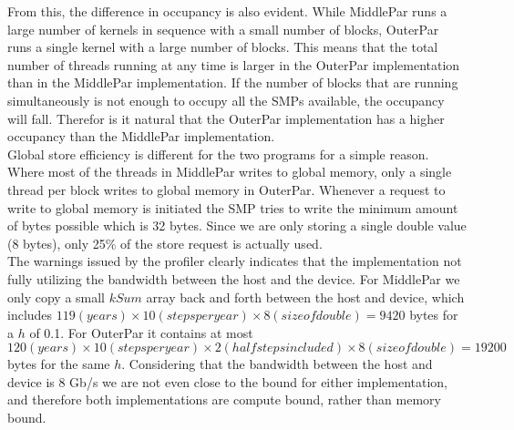 From this, the difference in occupancy is also evident. While MiddlePar runs a large number of kernels in sequence with a small number of blocks, OuterPar runs a single kernel with a large number of blocks. This means that the total number of threads running at any time is larger in the OuterPar implementation than in the MiddlePar implementation. If the number of blocks that are running simultaneously is not enough to occupy all the SMPs available, the occupancy will fall. Therefor is it natural that the OuterPar implementation has a higher occupancy than the MiddlePar implementation. \\


Global store efficiency is different for the two programs for a simple reason. Where most of the threads in MiddlePar writes to global memory, only a single thread per block writes to global memory in OuterPar. Whenever a request to write to global memory is initiated the SMP tries to write the minimum amount of bytes possible which is 32 bytes. Since we are only storing a single double value (8 bytes), only 25\% of the store request is actually used. \\

The warnings issued by the profiler clearly indicates that the implementation not fully utilizing the bandwidth between the host and the device. For MiddlePar we only copy a small $kSum$ array back and forth between the host and device, which  includes $119(years) \times 10(steps per year) \times 8(size of double) = 9420$ bytes for a $h$ of 0.1. For OuterPar it contains at most $120(years) \times 10(steps per year) \times 2(half steps included) \times 8(size of double) = 19200$ bytes for the same $h$. Considering that the bandwidth between the host and device is 8 Gb/s we are not even close to the bound for either implementation, and therefore both implementations are compute bound, rather than memory bound.


